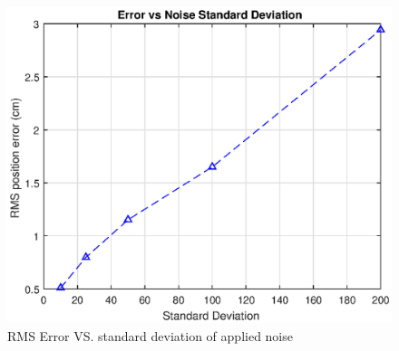 \documentclass[12pt]{article}
\begin{document}
\begin{figure}[h]
	\centering %
	\includegraphics[width=.6\textwidth]{errVstd.eps}
	\caption{RMS Error VS. standard deviation of applied noise} \label{errVstd}
\end{figure}
\end{document}
